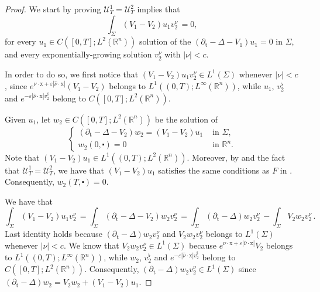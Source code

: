 \documentclass[10pt,a4paper]{amsart}
\newcommand{\R}{\mathbb{R}}
\newcommand{\tm}{\mathrm{t}}
\newcommand{\x}{\mathrm{x}}
\begin{document}
\begin{proof}
We start by proving $\mathcal{U}_{T}^{1}=\mathcal{U}_{T}^{2}$ implies that
\begin{equation}\label{EXP-PHYSICAL}
\int_{\Sigma}\left(V_{1}-V_{2}\right) u_{1} v_{2}^{\nu} \, =0,
\end{equation}
for every $u_{1}\in C([0,T]; L^2(\R^n))$ solution of the $(\partial_\tm - \Delta - V_{1})u_1 = 0$ in $\Sigma$, and every exponentially-growing solution $v_{2}^{\nu}$ with $|\nu| < c$.

In order to do so, we first notice that $(V_1 - V_2) u_1 v_2^\nu \in L^1(\Sigma)$
whenever $|\nu| < c$, since $ e^{\nu \cdot \x + \varepsilon |\hat \nu \cdot \x|} (V_1 - V_2)$
belongs to $L^1((0,T); L^\infty(\R^n))$, while $u_1$, $v_2^\flat$ and $e^{-\varepsilon |\hat \nu \cdot \x| v_2^\sharp}$ belong to $C([0, T] ; L^{2}(\mathbb{R}^{n}))$.


Given $u_{1}$, let $w_{2} \in C([0, T] ; L^{2}(\mathbb{R}^{n}))$ be the solution of 
$$
\begin{cases}\left( \partial_{\tm}-\Delta-V_{2}\right) w_{2}=\left(V_{1}-V_{2}\right) u_{1} & \text { in } \Sigma, \\ w_{2}(0, \centerdot)=0 & \text { in } \mathbb{R}^{n}.\end{cases}
$$
Note that $(V_{1}-V_{2})u_{1} \in L^{1}((0, T) ; L^{2}(\mathbb{R}^{n}))$. Moreover, by 
 and the fact that $\mathcal{U}_{T}^{1}=\mathcal{U}_{T}^{2}$,
we have that $(V_{1}-V_{2})u_{1}$ satisfies the same conditions as $F$ in 
. Consequently, $w_2(T, \centerdot)= 0$.

We have that
\[\int_{\Sigma}\left(V_{1}-V_{2}\right) u_{1} v_{2}^{\nu} \, = \int_{\Sigma}\left( \partial_{\tm}-\Delta-V_{2}\right) w_{2} v_{2}^{\nu} \, = \int_{\Sigma}\left( \partial_{\tm}-\Delta\right) w_{2} v_{2}^{\nu} \, - \int_{\Sigma} V_{2} w_{2} v_{2}^{\nu} \, .
\]
Last identity holds because $\left( \partial_{\tm}-\Delta\right) w_{2} v_{2}^{\nu}$ and 
$V_{2} w_{2} v_{2}^{\nu}$ belongs to $L^1(\Sigma)$ whenever $|\nu| < c$. We know that 
$V_{2} w_{2} v_{2}^{\nu} \in L^1(\Sigma)$ because 
$ e^{\nu \cdot \x + \varepsilon |\hat \nu \cdot \x|} V_2$ belongs to $L^1((0,T); L^\infty(\R^n))$, while $w_2$, $v_2^\flat$ and 
$e^{-\varepsilon |\hat \nu \cdot \x| v_2^\sharp}$ belong to
$C([0, T] ; L^{2}(\mathbb{R}^{n}))$. Consequently, 
$\left( \partial_{\tm}-\Delta\right) w_{2} v_{2}^{\nu} \in L^1(\Sigma)$ since
$(\partial_{\tm}-\Delta)w_2 = V_{2} w_{2} + \left(V_{1}-V_{2}\right) u_{1}$.




\end{proof}
\end{document}
